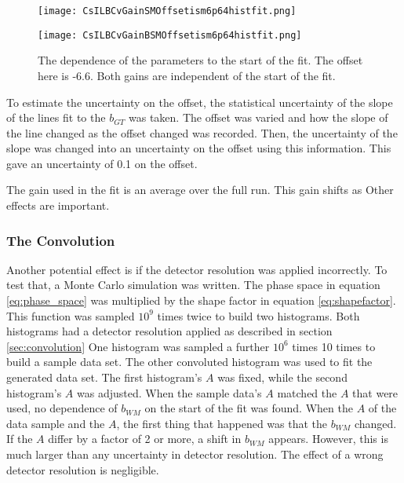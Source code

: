 \documentclass[../MaxHughesThesis.tex]{subfiles}
\begin{document}
\begin{figure}
    \centering
    \begin{minipage}{0.50\textwidth}
        \centerline{\texttt{[image: CsILBCvGainSMOffsetism6p64histfit.png]}}
    \end{minipage}\hfill
    \begin{minipage}{0.50\textwidth}
        \centerline{\texttt{[image: CsILBCvGainBSMOffsetism6p64histfit.png]}}
    \end{minipage}
    \caption{The dependence of the parameters to the start of the fit.
	     The offset here is -6.6.
    	     Both gains are independent of the start of the fit.}
    \label{fig:offset0LBCeffect}
\end{figure}

To estimate the uncertainty on the offset, the statistical uncertainty of the slope of the lines fit to the $b_{GT}$  was taken.
The offset was varied and how the slope of the line changed as the offset changed was recorded.
Then, the uncertainty of the slope was changed into an uncertainty on the offset using this information.
This gave an uncertainty of 0.1 on the offset.

The gain used in the fit is an average over the full run.
This gain shifts as 
Other effects are important. 


\subsubsection{The Convolution}

Another potential effect is if the detector resolution was applied incorrectly.
To test that, a Monte Carlo simulation was written.
The phase space in equation \ref{eq:phase_space} was multiplied by the shape factor in equation \ref{eq:shapefactor}.
This function was sampled $10^{9}$ times twice to build two histograms. 
Both histograms had a detector resolution applied as described in section \ref{sec:convolution}
One histogram was sampled a further $10^{6}$ times 10 times to build a sample data set.
The other convoluted histogram was used to fit the generated data set.
The first histogram's $A$ was fixed, while the second histogram's $A$ was adjusted.
When the sample data's $A$ matched the $A$ that were used, no dependence of $b_{WM}$ on the start of the fit was found.
When the $A$ of the data sample and the $A$, the first thing that happened was that the $b_{WM}$ changed.
If the $A$ differ by a factor of 2 or more, a shift in $b_{WM}$ appears.
However, this is much larger than any uncertainty in detector resolution.
The effect of a wrong detector resolution is negligible. 
\end{document}
